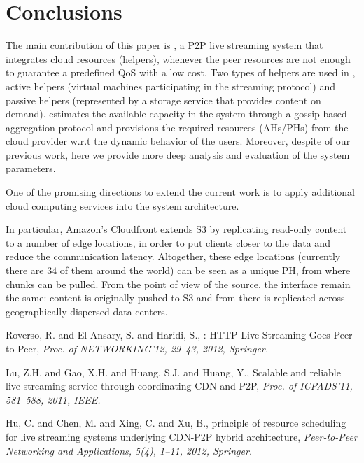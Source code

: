 {\section{Conclusions} \label{sec:conclusion}

The main contribution of this paper is \clive, a P2P live streaming system
that integrates cloud resources (helpers), whenever the peer resources are not
enough to guarantee a predefined QoS with a low cost. Two types of helpers are
used in \clive, active helpers (virtual machines participating in the streaming
protocol) and passive helpers (represented by a storage service that
provides content on demand). \clive estimates the available capacity in the
system through a gossip-based aggregation protocol and provisions the required
resources (AHs/PHs) from the cloud provider w.r.t the dynamic behavior of the
users.
%
Moreover, despite of our previous \clive work, here we provide more deep analysis
and evaluation of the system parameters.

One of the promising directions to extend the current work is to apply 
additional cloud computing services into the system architecture.

In particular, Amazon's Cloudfront extends S3 by
replicating read-only content to a number of edge locations, in order
to put clients closer to the data and reduce the communication latency.
Altogether, these edge locations (currently there are $34$ of them around the
world) can be seen as a unique PH, from where chunks can be pulled. From the
point of view of the source, the interface remain the same: content is
originally pushed to S3 and from there is replicated across geographically
dispersed data centers.

\begin{thebibliography}{5}

Roverso, R. and El-Ansary, S. and Haridi, S.,
: {HTTP}-Live Streaming Goes Peer-to-Peer,
\newblock \emph{Proc. of NETWORKING'12, 29--43, 2012, Springer.}

Lu, Z.H. and Gao, X.H. and Huang, S.J. and Huang, Y.,
\newblock Scalable and reliable live streaming service through coordinating {CDN} and {P2P},
\newblock \emph{Proc. of ICPADS'11, 581--588, 2011, IEEE.}

Hu, C. and Chen, M. and Xing, C. and Xu, B.,
 principle of resource scheduling for live streaming systems underlying {CDN-P2P} hybrid architecture,
\newblock \emph{Peer-to-Peer Networking and Applications, 5(4), 1--11, 2012, Springer.}


\end{thebibliography}}
